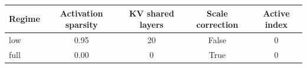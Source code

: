 \begin{tabular}{lcccc}
\toprule
Regime & Activation sparsity & KV shared layers & Scale correction & Active index \\
\midrule
low & 0.95 & 20 & False & 0 \\
full & 0.00 & 0 & True & 0 \\
\bottomrule
\end{tabular}
